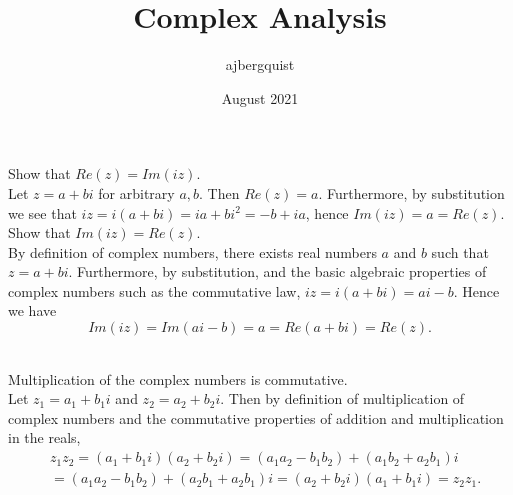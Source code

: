 \documentclass{article}
\title{Complex Analysis}
\author{ajbergquist }
\date{August 2021}
\newcommand{\cs}[1]{\color{blue}{#1}\normalcolor}
\begin{document}
 Show that $Re(z) = Im(iz)$.\\
 Let $z = a + bi$ for arbitrary $a,b$. Then $Re(z) = a.$ Furthermore, by substitution we see that $iz = i(a+bi) = ia+bi^2 = -b+ia$, hence $Im(iz) = a = Re(z).$\\
 Show that $Im(iz) = Re(z)$.\\
 By definition of complex numbers, there exists real numbers $a$ and $b$ such that $z = a+bi$. Furthermore, by substitution, and the basic algebraic properties of complex numbers such as the commutative law, $iz = i(a+bi) = ai-b.$ Hence we have $$Im(iz) = Im(ai-b) = a = Re(a+bi) = Re(z).$$

\cs{2 has two parts (maybe a change from 8th to 9th edition?). Let me know when you're ready for me to look at part (a).}

\cs{3/5}

\cs{Ta-da! 5/5}

\\
 Multiplication of the complex numbers is commutative.\\
 Let $z_1 = a_1+b_1i$ and $z_2 = a_2+b_2i$. Then by definition of multiplication of complex numbers and the commutative properties of addition and multiplication in the reals, 
$$\begin{array}{cc}
     & z_1z_2 = (a_1+b_1i)(a_2+b_2i) = (a_1a_2 - b_1b_2) + (a_1b_2 + a_2b_1)i \\
     &= (a_1a_2 - b_1b_2) + (a_2b_1 + a_2b_1)i = (a_2+b_2i)(a_1+b_1i) = z_2z_1. \\
     & 
\end{array}$$

\cs{5/5}

\sout{\cs{8/10}} \cs{10/10}
\end{document}
